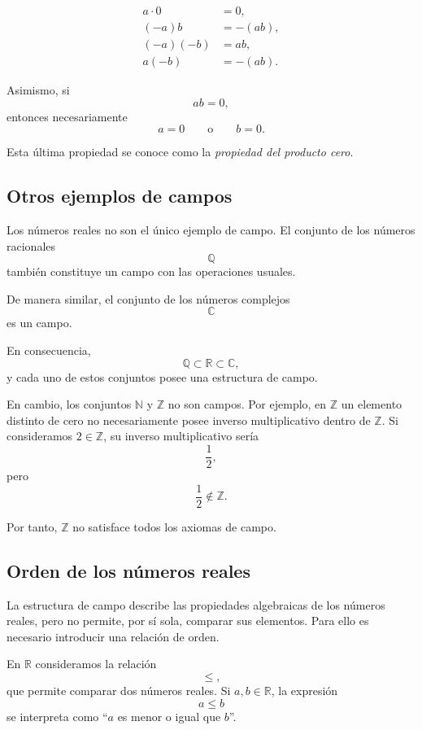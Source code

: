 \documentclass[12pt]{article}
\theoremstyle{plain}
\theoremstyle{definition}
\theoremstyle{remark}
\begin{document}
\begin{align*}
a\cdot0 &= 0,\\
(-a)b &= -(ab),\\
(-a)(-b) &= ab,\\
a(-b) &= -(ab).
\end{align*}

Asimismo, si
\[
ab=0,
\]
entonces necesariamente
\[
a=0
\qquad\text{o}\qquad
b=0.
\]

Esta última propiedad se conoce como la \emph{propiedad del producto cero}.

\subsection*{Otros ejemplos de campos}

Los números reales no son el único ejemplo de campo. El conjunto de los
números racionales
\[
\mathbb{Q}
\]
también constituye un campo con las operaciones usuales.

De manera similar, el conjunto de los números complejos
\[
\mathbb{C}
\]
es un campo.

En consecuencia,
\[
\mathbb{Q}\subset\mathbb{R}\subset\mathbb{C},
\]
y cada uno de estos conjuntos posee una estructura de campo.

En cambio, los conjuntos $\mathbb{N}$ y $\mathbb{Z}$ no son campos. Por
ejemplo, en $\mathbb{Z}$ un elemento distinto de cero no necesariamente
posee inverso multiplicativo dentro de $\mathbb{Z}$. Si consideramos
$2\in\mathbb{Z}$, su inverso multiplicativo sería
\[
\frac{1}{2},
\]
pero
\[
\frac{1}{2}\notin\mathbb{Z}.
\]

Por tanto, $\mathbb{Z}$ no satisface todos los axiomas de campo.

\subsection{Orden de los números reales}

La estructura de campo describe las propiedades algebraicas de los números
reales, pero no permite, por sí sola, comparar sus elementos. Para ello es
necesario introducir una relación de orden.

En $\mathbb{R}$ consideramos la relación
\[
\leq,
\]
que permite comparar dos números reales. Si $a,b\in\mathbb{R}$, la expresión
\[
a\leq b
\]
se interpreta como ``$a$ es menor o igual que $b$''.
\end{document}
